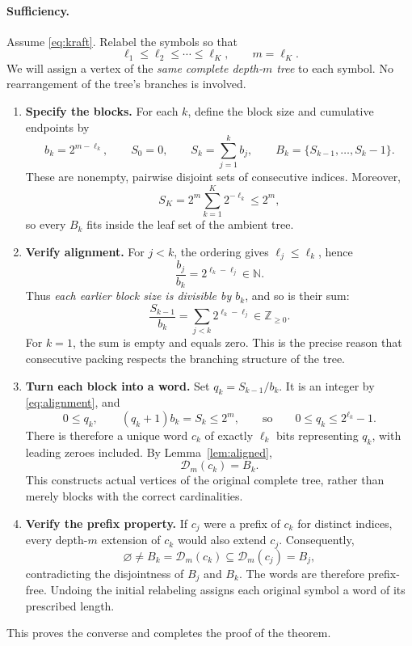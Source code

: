 \documentclass[11pt]{article}
\newcommand{\Desc}{\mathcal D}
\begin{document}
\paragraph{Sufficiency.}
Assume \eqref{eq:kraft}. Relabel the symbols so that
\[
   \ell_1\leq\ell_2\leq\cdots\leq\ell_K,
   \qquad m=\ell_K.
\]
We will assign a vertex of the \emph{same complete depth-$m$ tree} to each
symbol. No rearrangement of the tree's branches is involved.

\begin{enumerate}[label=\textbf{\arabic*.}]
\item \textbf{Specify the blocks.}
For each $k$, define the block size and cumulative endpoints by
\begin{equation}\label{eq:blocks}
 b_k=2^{m-\ell_k},\qquad S_0=0,\qquad
 S_k=\sum_{j=1}^k b_j,
 \qquad B_k=\{S_{k-1},\ldots,S_k-1\}.
\end{equation}
These are nonempty, pairwise disjoint sets of consecutive indices.
Moreover,
\[
 S_K=2^m\sum_{k=1}^K2^{-\ell_k}\leq2^m,
\]
so every $B_k$ fits inside the leaf set of the ambient tree.

\item \textbf{Verify alignment.}
For $j<k$, the ordering gives $\ell_j\leq\ell_k$, hence
\[
 \frac{b_j}{b_k}=2^{\ell_k-\ell_j}\in\mathbb N.
\]
Thus \emph{each earlier block size is divisible by $b_k$}, and so is their
sum:
\begin{equation}\label{eq:alignment}
 \frac{S_{k-1}}{b_k}
    =\sum_{j<k}2^{\ell_k-\ell_j}\in\mathbb Z_{\geq0}.
\end{equation}
For $k=1$, the sum is empty and equals zero. This is the precise reason
that consecutive packing respects the branching structure of the tree.

\item \textbf{Turn each block into a word.}
Set $q_k=S_{k-1}/b_k$. It is an integer by \eqref{eq:alignment}, and
\[
 0\leq q_k,
 \qquad (q_k+1)b_k=S_k\leq2^m,
 \qquad\text{so}\qquad 0\leq q_k\leq2^{\ell_k}-1.
\]
There is therefore a unique word $c_k$ of exactly $\ell_k$ bits representing
$q_k$, with leading zeroes included. By Lemma~\ref{lem:aligned},
\begin{equation}\label{eq:chosen-descendants}
     \Desc_m(c_k)=B_k.
\end{equation}
This constructs actual vertices of the original complete tree, rather than
merely blocks with the correct cardinalities.

\item \textbf{Verify the prefix property.}
If $c_j$ were a prefix of $c_k$ for distinct indices, every depth-$m$
extension of $c_k$ would also extend $c_j$. Consequently,
\[
  \varnothing\ne B_k=\Desc_m(c_k)
             \subseteq\Desc_m(c_j)=B_j,
\]
contradicting the disjointness of $B_j$ and $B_k$. The words are therefore
prefix-free. Undoing the initial relabeling assigns each original symbol
a word of its prescribed length.
\end{enumerate}
This proves the converse and completes the proof of the theorem.
\end{document}
